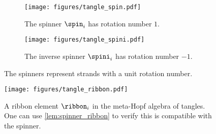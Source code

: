 \begin{figure}[h]
        \centering
        \begin{subfigure}[b]{0.4\textwidth}
                \centering
                \texttt{[image: figures/tangle\_spin.pdf]}
                \caption{The spinner $\spin_i$ has rotation number $1$.}
                \label{fig:tangle_spin}
        \end{subfigure}
        \begin{subfigure}[b]{0.4\textwidth}
                \centering
                \texttt{[image: figures/tangle\_spini.pdf]}
                \caption{The inverse spinner $\spini_i$ has rotation number
                $-1$.}
                \label{fig:tangle_spini}
        \end{subfigure}
        \caption{The spinners represent strands with a unit rotation number.}
        \label{fig:tangle_spinner}
\end{figure}
\begin{figure}[h]
        \centering
        \texttt{[image: figures/tangle\_ribbon.pdf]}
        \caption{A ribbon element $\ribbon_i$ in the meta-Hopf algebra of
                tangles. One can use \cref{lem:spinner_ribbon} to verify this is
                compatible with the spinner.
        }
        \label{fig:tangle_ribbon}
\end{figure}

